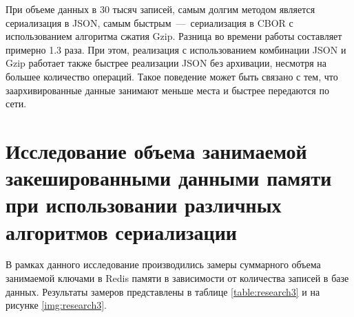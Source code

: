 При объеме данных в 30 тысяч записей, самым долгим методом является сериализация в JSON, самым быстрым~---~сериализация в CBOR с использованием алгоритма сжатия Gzip. Разница во времени работы составляет примерно 1.3 раза. При этом, реализация с использованием комбинации JSON и Gzip работает также быстрее реализации JSON без архивации, несмотря на большее количество операций. Такое поведение может быть связано с тем, что заархивированные данные занимают меньше места и быстрее передаются по сети.

\section{Исследование объема занимаемой закешированными данными памяти при использовании различных алгоритмов сериализации}

В рамках данного исследование производились замеры суммарного объема занимаемой ключами в Redis памяти в зависимости от количества записей в базе данных. Результаты замеров представлены в таблице \ref{table:research3} и на рисунке \ref{img:research3}.

